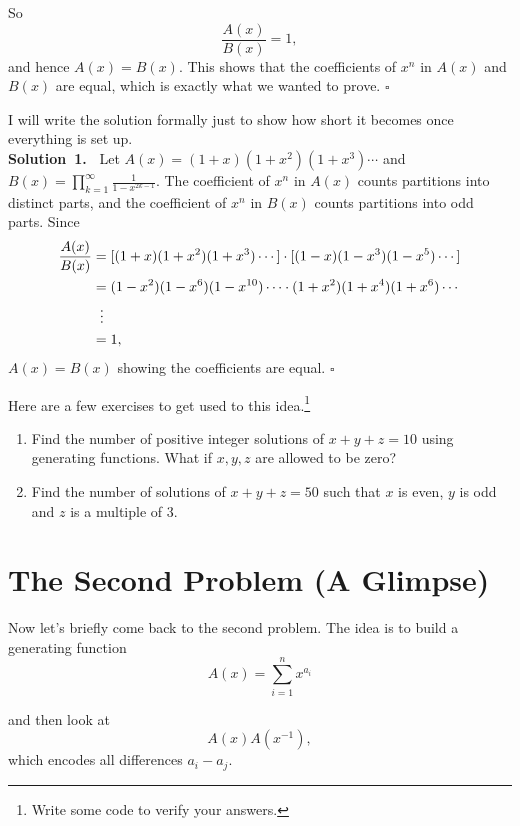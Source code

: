 \documentclass[11pt]{scrartcl}
\theoremstyle{plain}
\theoremstyle{definition}
\theoremstyle{remark}
\newcounter{problem}
\newcounter{solution}
\newcounter{numsolution}
\newcommand{\numsolution}[2]{%
    \refstepcounter{numsolution}%
    \noindent\textbf{Solution~#1.~}#2%
    \vspace{0.3cm}\par%
}
\begin{document}
\bigskip

\noindent So
\[
\frac{A(x)}{B(x)} = 1,
\]
and hence $A(x)=B(x)$. This shows that the coefficients of $x^n$ in $A(x)$ and $B(x)$ are equal, which is exactly what we wanted to prove. $\square$

\bigskip

\noindent I will write the solution formally just to show how short it becomes once everything is set up.\\

\numsolution{1}{
Let $A(x) = (1+x)(1+x^2)(1+x^3)\cdots$ and $B(x) = \prod_{k=1}^{\infty} \frac{1}{1-x^{2k-1}}$. The coefficient of $x^n$ in $A(x)$ counts partitions into distinct parts, and the coefficient of $x^n$ in $B(x)$ counts partitions into odd parts. Since 
\begin{align*}
\frac{A(x)}{B(x)} &= [(1+x)(1+x^2)(1+x^3)\cdots]\cdot[(1-x)(1-x^3)(1-x^5)\cdots]\\
&= (1-x^2)(1-x^6)(1-x^{10})\cdots \cdot (1+x^2)(1+x^4)(1+x^6)\cdots\\
&\hspace{0.2cm}\vdots\\
&= 1,
\end{align*}
$A(x)=B(x)$ showing the coefficients are equal. $\square$
}
\vspace{5cm}

\noindent Here are a few exercises to get used to this idea.\footnote{Write some code to verify your answers.}

\begin{enumerate}[label=(\alph*)]
    \item Find the number of positive integer solutions of $x+y+z=10$ using generating functions. What if $x,y,z$ are allowed to be zero?
    \item Find the number of solutions of $x+y+z=50$ such that $x$ is even, $y$ is odd and $z$ is a multiple of $3$.
\end{enumerate}

\section{The Second Problem (A Glimpse)}

\noindent Now let's briefly come back to the second problem. The idea is to build a generating function
\[
A(x) = \sum_{i=1}^{n} x^{a_i}
\]

\noindent and then look at
\[
A(x)A(x^{-1}),
\]
which encodes all differences $a_i - a_j$.
\end{document}
